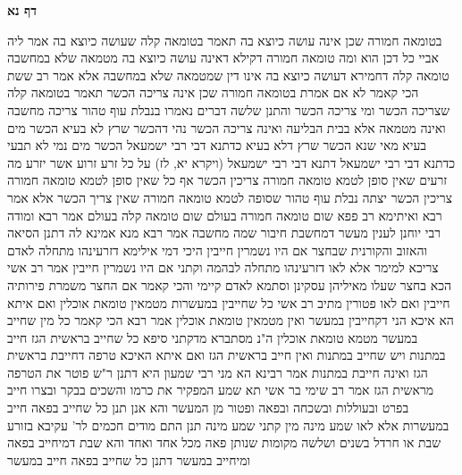 \documentclass[12pt, openany]{book}
\newcommand{\sethebfont}{
\fontsize{10.5pt}{21.0pt} \selectfont
}
\newcommand{\twocol}[1]{
	{\sethebfont \begin{multicols}{2}
			#1
	\end{multicols}}	
}
\newcommand{\sectname}{}
\newcommand{\newsection}[1]{
	\addcontentsline{toc}{section}{#1}
	\renewcommand{\sectname}{#1}	
	\vspace{-\baselineskip}
	\begin{center}
		\textbf{%
\fontsize{16pt}{16pt}\selectfont
			#1}
	\end{center}
	\vspace{-\baselineskip}
	\nopagebreak
}
\begin{document}
\newsection{דף נא}
\twocol{בטומאה חמורה שכן אינה עושה כיוצא בה תאמר בטומאה קלה שעושה כיוצא בה 
אמר ליה אביי  כל דכן הוא ומה טומאה חמורה דקילא דאינה עושה כיוצא בה מטמאה שלא במחשבה  טומאה קלה דחמירא דעושה כיוצא בה אינו דין שמטמאה שלא במחשבה 
אלא אמר רב ששת הכי קאמר  לא אם אמרת בטומאה חמורה שכן אינה צריכה הכשר תאמר בטומאה קלה שצריכה הכשר 
ומי צריכה הכשר  והתנן שלשה דברים נאמרו בנבלת עוף טהור  צריכה מחשבה ואינה מטמאה אלא בבית הבליעה ואינה צריכה הכשר 
נהי דהכשר שרץ לא בעיא הכשר מים בעיא 
מאי שנא הכשר שרץ דלא בעיא כדתנא דבי רבי ישמעאל הכשר מים נמי לא תבעי כדתנא דבי רבי ישמעאל 
דתנא דבי רבי ישמעאל  (ויקרא יא, לז) על כל זרע זרוע אשר יזרע
מה זרעים שאין סופן לטמא טומאה חמורה צריכין הכשר אף כל שאין סופן לטמא טומאה חמורה צריכין הכשר יצתה נבלת עוף טהור שסופה לטמא טומאה חמורה שאין צריך הכשר 
אלא אמר רבא ואיתימא רב פפא  שום טומאה חמורה בעולם שום טומאה קלה בעולם 
אמר רבא  ומודה רבי יוחנן לענין מעשר דמחשבת חיבור שמה מחשבה  אמר רבא  מנא אמינא לה דתנן הסיאה והאזוב והקורנית שבחצר אם היו נשמרין חייבין 
היכי דמי  אילימא דזרעינהו מתחלה לאדם צריכא למימר  אלא לאו דזרעינהו מתחלה לבהמה וקתני  אם היו נשמרין חייבין 
אמר רב אשי  הכא בחצר שעלו מאיליהן עסקינן וסתמא לאדם קיימי  והכי קאמר  אם החצר משמרת פירותיה חייבין ואם לאו פטורין 
מתיב רב אשי  כל שחייבין במעשרות מטמאין טומאת אוכלין  ואם איתא הא איכא הני דקחייבין במעשר ואין מטמאין טומאת אוכלין 
אמר רבא הכי קאמר  כל מין שחייב במעשר מטמא טומאת אוכלין 
ה"נ מסתברא מדקתני סיפא  כל שחייב בראשית הגז חייב במתנות ויש שחייב במתנות ואין חייב בראשית הגז 
ואם איתא האיכא טרפה דחייבת בראשית הגז ואינה חייבת במתנות 
אמר רבינא  הא מני רבי שמעון היא דתנן  ר"ש פוטר את הטרפה מראשית הגז 
אמר רב שימי בר אשי תא שמע  המפקיר את כרמו והשכים בבקר ובצרו חייב בפרט ובעוללות ובשכחה ובפאה ופטור מן המעשר 
והא אנן תנן  כל שחייב בפאה חייב במעשרות  אלא לאו שמע מינה  מין קתני שמע מינה 
תנן התם  מודים חכמים לר' עקיבא בזורע שבת או חרדל בשנים ושלשה מקומות שנותן פאה מכל אחד ואחד
והא שבת דמיחייב בפאה ומיחייב במעשר דתנן  כל שחייב בפאה חייב במעשר 
}
\end{document}
